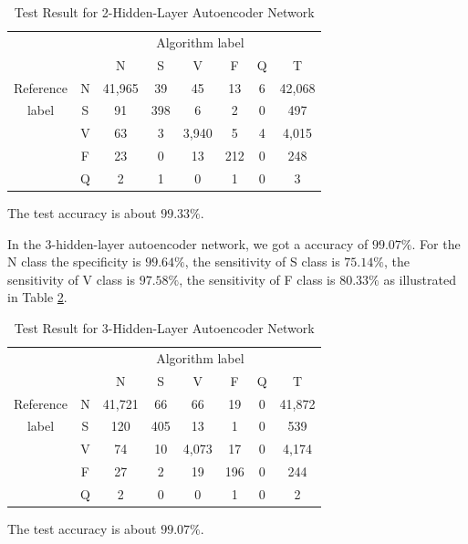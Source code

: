 \documentclass[journal]{IEEEtran}
\begin{document}
\begin{table}[!htbp]
\begin{center}
\begin{threeparttable}
\caption{Test Result for 2-Hidden-Layer Autoencoder Network}
\label{table6}
\begin{tabular}{cccccccc}
\hline
\multicolumn{6}{r}{Algorithm label} \\
\cline{3-7}
&  & N & S & V & F & Q & T\\
\hline
 Reference & N & 41,965 &  39  &  45  & 13  &  6  &  42,068 \\
	label & S &  91   & 398  &  6   & 2   & 0   &  497\\
			      & V &  63   & 3    & 3,940 & 5   & 4   &  4,015\\
			      & F &  23   & 0    & 13   & 212 & 0   &  248\\
			      & Q & 2     & 1    & 0    & 1   & 0   &  3\\
\hline
\end{tabular}
\begin{tablenotes}
\item The test accuracy is about $99.33\%$.
\end{tablenotes}
\end{threeparttable}
\end{center}
\end{table}

In the 3-hidden-layer autoencoder network, we got a accuracy of $99.07\%$. For the N class the specificity is $99.64\%$, the sensitivity of S class is $75.14\%$, the sensitivity of V class is $97.58\%$, the sensitivity of F class is $80.33\%$ as illustrated in Table \ref{table6}. 

\begin{table}[!htbp]
\begin{center}
\begin{threeparttable}
\caption{Test Result for 3-Hidden-Layer Autoencoder Network}
\label{table6}
\begin{tabular}{cccccccc}
\hline
\multicolumn{6}{r}{Algorithm label} \\
\cline{3-7}
&  & N & S & V & F & Q & T\\
\hline
 Reference & N & 41,721 &  66  &  66  & 19  &  0 &  41,872 \\
	label & S &  120  & 405  &  13  & 1   & 0  &  539\\
			   & V &  74   & 10   & 4,073 & 17  & 0  &  4,174\\
			   & F &  27   & 2    & 19   & 196 & 0  &  244\\
			   & Q & 2     & 0    & 0    & 1   & 0  &  2\\
\hline
\end{tabular}
\begin{tablenotes}
\item The test accuracy is about $99.07\%$.
\end{tablenotes}
\end{threeparttable}
\end{center}
\end{table}
\end{document}
